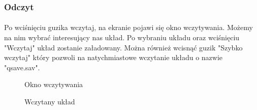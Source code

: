 \subsubsection{Odczyt}\label{ssub:odczyt}
\paragraph{}

Po wciśnięciu guzika wczytaj, na ekranie pojawi się okno wczytywania. Możemy na nim wybrać interesujący nas układ. Po wybraniu układu oraz wciśnięciu "Wczytaj" układ zostanie załadowany. Można również wcisnąć guzik "Szybko wczytaj" który pozwoli na natychmiastowe wczytanie układu o nazwie "qsave.sav".

\begin{figure}[ht!]
\centering
{}
\caption{Okno wczytywania}
\label{fig:inst_01}
\end{figure}

\begin{figure}[ht!]
\centering
{}
\caption{Wczytany układ}
\label{fig:inst_02}
\end{figure}

